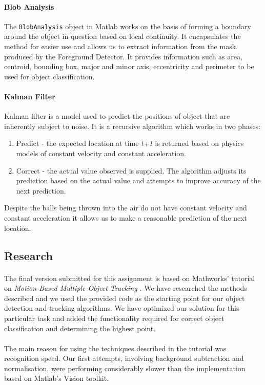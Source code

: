 \documentclass[10pt,a4paper]{article}
\begin{document}
\begin{multicols}{2}
\paragraph{Blob Analysis}
The \texttt{BlobAnalysis} object in Matlab works on the basis of forming a boundary around the object in question based on local continuity. It encapsulates the method for easier use and allows us to extract information from the mask produced by the Foreground Detector. It provides information such as area, centroid, bounding box, major and minor axis, eccentricity and perimeter to be used for object classification.

\paragraph{Kalman Filter}
Kalman filter is a model used to predict the positions of object that are inherently subject to noise. It is a recursive algorithm which works in two phases:

\begin{enumerate}
\item Predict - the expected location at time \textit{t+1} is returned based on physics models of constant velocity and constant acceleration.
\item Correct - the actual value observed is supplied. The algorithm adjusts its prediction based on the actual value and attempts to improve accuracy of the next prediction.
\end{enumerate}

Despite the balls being thrown into the air do not have constant velocity and constant acceleration it allows us to make a reasonable prediction of the next location.

\subsection{Research}

\paragraph{} The final version submitted for this assignment is based on Mathworks' tutorial on {\itshape Motion-Based Multiple Object Tracking \cite{ES2}}. We have researched the methods described and we used the provided code as the starting point for our object detection and tracking algorithms. We have optimized our solution for this particular task and added the functionality required for correct object classification and determining the highest point.
\paragraph{}	The main reason for using the techniques described in the tutorial was recognition speed. Our first attempts, involving background subtraction and normalisation, were performing considerably slower than the implementation based on Matlab's Vision toolkit.

\end{multicols}
\end{document}
